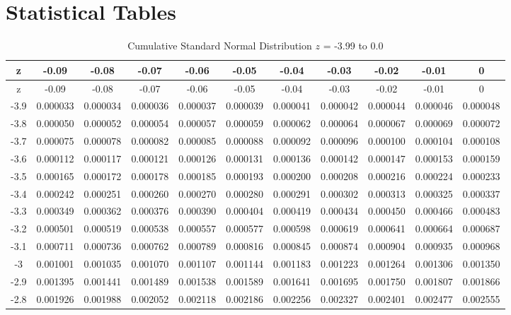 \documentclass[
]{book}
\theoremstyle{definition}
\theoremstyle{definition}
\theoremstyle{definition}
\theoremstyle{definition}
\theoremstyle{remark}
\begin{document}
\cleardoublepage

\hypertarget{app:StatTables}{%
\chapter{Statistical Tables}\label{app:StatTables}}

\hypertarget{appB:tab:N01a}{}
\begin{longtable}[]{@{}ccccccccccc@{}}
\caption{Cumulative Standard Normal Distribution \(z\) = -3.99 to 0.0}\tabularnewline
\toprule
z & -0.09 & -0.08 & -0.07 & -0.06 & -0.05 & -0.04 & -0.03 & -0.02 & -0.01 & 0 \\
\midrule
\endfirsthead
\toprule
z & -0.09 & -0.08 & -0.07 & -0.06 & -0.05 & -0.04 & -0.03 & -0.02 & -0.01 & 0 \\
\midrule
\endhead
-3.9 & 0.000033 & 0.000034 & 0.000036 & 0.000037 & 0.000039 & 0.000041 & 0.000042 & 0.000044 & 0.000046 & 0.000048 \\
-3.8 & 0.000050 & 0.000052 & 0.000054 & 0.000057 & 0.000059 & 0.000062 & 0.000064 & 0.000067 & 0.000069 & 0.000072 \\
-3.7 & 0.000075 & 0.000078 & 0.000082 & 0.000085 & 0.000088 & 0.000092 & 0.000096 & 0.000100 & 0.000104 & 0.000108 \\
-3.6 & 0.000112 & 0.000117 & 0.000121 & 0.000126 & 0.000131 & 0.000136 & 0.000142 & 0.000147 & 0.000153 & 0.000159 \\
-3.5 & 0.000165 & 0.000172 & 0.000178 & 0.000185 & 0.000193 & 0.000200 & 0.000208 & 0.000216 & 0.000224 & 0.000233 \\
-3.4 & 0.000242 & 0.000251 & 0.000260 & 0.000270 & 0.000280 & 0.000291 & 0.000302 & 0.000313 & 0.000325 & 0.000337 \\
-3.3 & 0.000349 & 0.000362 & 0.000376 & 0.000390 & 0.000404 & 0.000419 & 0.000434 & 0.000450 & 0.000466 & 0.000483 \\
-3.2 & 0.000501 & 0.000519 & 0.000538 & 0.000557 & 0.000577 & 0.000598 & 0.000619 & 0.000641 & 0.000664 & 0.000687 \\
-3.1 & 0.000711 & 0.000736 & 0.000762 & 0.000789 & 0.000816 & 0.000845 & 0.000874 & 0.000904 & 0.000935 & 0.000968 \\
-3 & 0.001001 & 0.001035 & 0.001070 & 0.001107 & 0.001144 & 0.001183 & 0.001223 & 0.001264 & 0.001306 & 0.001350 \\
-2.9 & 0.001395 & 0.001441 & 0.001489 & 0.001538 & 0.001589 & 0.001641 & 0.001695 & 0.001750 & 0.001807 & 0.001866 \\
-2.8 & 0.001926 & 0.001988 & 0.002052 & 0.002118 & 0.002186 & 0.002256 & 0.002327 & 0.002401 & 0.002477 & 0.002555 \\

\end{longtable}
\end{document}
